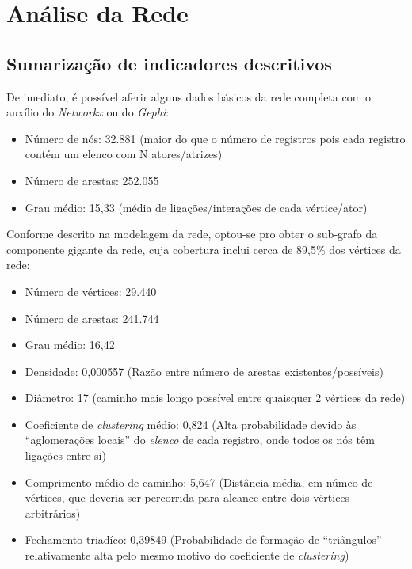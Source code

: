 
\chapter{Análise da Rede}

\section{Sumarização de indicadores descritivos}

De imediato, é possível aferir alguns dados básicos da rede completa com o auxílio do \textit{Networkx} ou do \textit{Gephi}:

\begin{itemize}
	\item Número de nós: 32.881 (maior do que o número de registros pois cada registro contém um elenco com N atores/atrizes)
	\item Número de arestas: 252.055
	\item Grau médio:  15,33 (média de ligações/interações de cada vértice/ator)
\end{itemize}

Conforme descrito na modelagem da rede, optou-se pro obter o sub-grafo da componente gigante da rede, cuja cobertura inclui cerca de 89,5\% dos vértices da rede:

\begin{itemize}
	\item Número de vértices: 29.440
	\item Número de arestas: 241.744
	\item Grau médio:  16,42
	\item Densidade: 0,000557 (Razão entre número de arestas existentes/possíveis)
	\item Diâmetro: 17 (caminho mais longo possível entre quaisquer 2 vértices da rede)
	\item Coeficiente de \textit{clustering} médio: 0,824 (Alta probabilidade devido às “aglomerações locais” do \textit{elenco} de cada registro, onde todos os nós têm ligações entre si)
	\item Comprimento médio de caminho: 5,647 (Distância média, em númeo de vértices, que deveria ser percorrida para alcance entre dois vértices arbitrários)
	\item Fechamento triadíco: 0,39849 (Probabilidade de formação de “triângulos” - relativamente alta pelo mesmo motivo do coeficiente de \textit{clustering})

\end{itemize}

